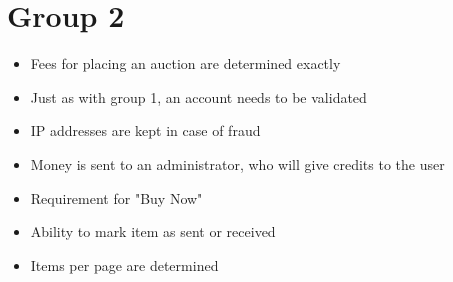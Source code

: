\documentclass[10pt,a4paper]{article}
\begin{document}
\section{Group 2}

\begin{itemize}
	\item Fees for placing an auction are determined exactly
	\item Just as with group 1, an account needs to be validated
	\item IP addresses are kept in case of fraud
	\item Money is sent to an administrator, who will give credits to the user
	\item Requirement for "Buy Now"
	\item Ability to mark item as sent or received
	\item Items per page are determined
\end{itemize}
\end{document}

